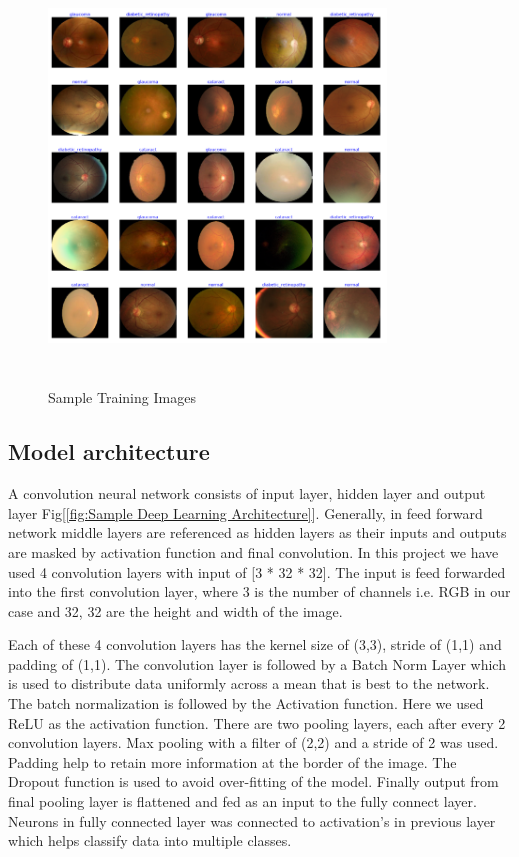 \documentclass[conference]{IEEEtran}
\begin{document}
\begin{figure}[ht]
    \centering
    \includegraphics[width=0.8\textwidth,height = 11cm]{Images/Sample Images.png}
    \caption{Sample Training Images}
    \label{fig:Sample Training Images}
\end{figure}


\subsection{Model architecture}
A convolution neural network consists of input layer, hidden layer and output layer Fig[\ref{fig:Sample Deep Learning  Architecture}]. Generally,  in feed forward network middle layers are referenced as hidden layers as their inputs and outputs are masked by activation function and final convolution. In this project we have used 4 convolution layers with input of [3 * 32 * 32]. The input is feed forwarded into the first convolution layer, where 3 is the number of channels i.e. RGB in our case and 32, 32 are the height and width of the image.

\vspace{5pt}
Each of these 4 convolution layers has the kernel size of (3,3), stride of (1,1) and padding of (1,1). The convolution layer is followed by a Batch Norm Layer which is used to distribute data uniformly across a mean that is best to the network. The batch normalization is followed by the Activation function. Here we used ReLU as the activation function. There are two pooling layers, each after every 2 convolution layers. Max pooling with a filter of (2,2) and a stride of 2 was used. Padding help to retain more information at the border of the image. The Dropout function is used to avoid over-fitting of the model. Finally output from final pooling layer is flattened and fed as an input to the fully connect layer. Neurons in fully connected layer was connected to activation's in previous layer which helps classify data into multiple classes.
\end{document}
